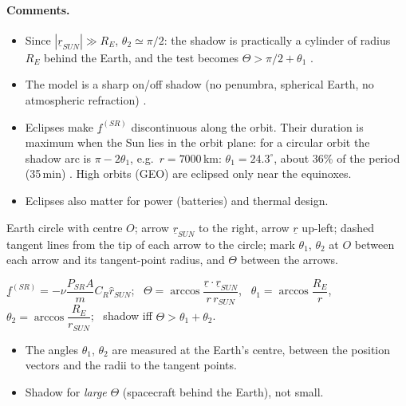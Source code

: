 \paragraph{Comments.}
\begin{itemize}
\item Since $|\underline r_{SUN}|\gg R_E$, $\theta_2\simeq\pi/2$: the shadow is practically a cylinder of radius $R_E$ behind the Earth, and the
test becomes $\Theta>\pi/2+\theta_1$ \notinnotes.
\item The model is a sharp on/off shadow (no penumbra, spherical Earth, no atmospheric refraction) \notinnotes.
\item Eclipses make $\underline f^{(SR)}$ discontinuous along the orbit. Their duration is maximum when the Sun lies in the orbit plane:
for a circular orbit the shadow arc is $\pi-2\theta_1$, e.g.\ $r=7000$\,km: $\theta_1=24.3^\circ$, about 36\% of the period
(35\,min) \notinnotes. High orbits (GEO) are eclipsed only near the equinoxes.
\item Eclipses also matter for power (batteries) and thermal design.
\end{itemize}

\begin{fig2draw}
Earth circle with centre $O$; arrow $\underline r_{SUN}$ to the right, arrow $\underline r$ up-left; dashed tangent lines from the tip of each
arrow to the circle; mark $\theta_1$, $\theta_2$ at $O$ between each arrow and its tangent-point radius, and $\Theta$ between the arrows.
\end{fig2draw}

\begin{keyf}
$\underline f^{(SR)}=-\nu\dfrac{P_{SR}A}{m}C_R\hat r_{SUN}$; \ $\Theta=\arccos\dfrac{\underline r\cdot\underline r_{SUN}}{r\,r_{SUN}}$, \
$\theta_1=\arccos\dfrac{R_E}{r}$, \ $\theta_2=\arccos\dfrac{R_E}{r_{SUN}}$; \ shadow iff $\Theta>\theta_1+\theta_2$.
\end{keyf}

\pitfalls
\begin{itemize}
\item The angles $\theta_1$, $\theta_2$ are measured at the Earth's centre, between the position vectors and the radii to the tangent points.
\item Shadow for \emph{large} $\Theta$ (spacecraft behind the Earth), not small.
\end{itemize}


